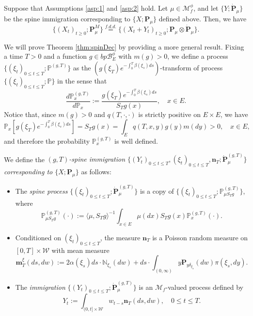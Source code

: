 \begin{thm}\label{thm:spinDec}
    Suppose that Assumptions \ref{asp:1} and \ref{asp:2} hold.
	Let $\mu \in \mathcal M_f^\phi$, and let $\{Y; \dot {\mathbf P}_\mu\}$ be the spine immigration corresponding to $\{X; \mathbf P_\mu\}$ defined above.
	Then, we have
\[
    \{(X_t)_{t\geq 0}; \mathbf P_\mu^M\}
    \overset{f.d.d.}{=} \{(X_t + Y_t)_{t\geq 0}; \mathbf P_\mu \otimes\dot{\mathbf P}_\mu\}.
\]
\end{thm}
\par
	We will prove Theorem \ref{thm:spinDec} by providing a more general result.
	Fixing a time $T>0$ and a function $g \in bp\mathscr B^\phi_E$ with $m(g)>0$, we define a process $\{(\xi_t)_{0 \leq t \leq T}; \mathbb P^{(g, T)}\}$ as the $(g(\xi_T) e^{-\int_0^T \beta(\xi_s) ds})$-transform of process $\{(\xi_t)_{0\leq t\leq T}; \mathbb P\}$ in the sense that
\[
	\frac {d \mathbb P^{(g,T)}_x} {d \mathbb P_x}
	:= \frac {g(\xi_T) e^{-\int_0^T \beta(\xi_s) ds}} {S_T g(x)},
	\quad x \in E.
\]
	Notice that, since $m(g) > 0$ and $q(T,\cdot,\cdot)$ is strictly positive on $E \times E$, we have
\[
	\mathbb P_x[ g(\xi_T) e^{-\int_0^T \beta(\xi_s) ds} ]
	= S_T g(x)
	= \int_E q(T,x,y) g(y) m(dy)
	> 0,
	\quad x \in E,
\]
	and therefore the probability $\mathbb P_x^{(g,T)}$ is well defined.
\par
	We define the \emph{$(g,T)$-spine immigration $\{(Y_t)_{0\leq t\leq T}, (\xi_t)_{0\leq t\leq T}, \mathbf n_T; \dot {\mathbf P}^{(g,T)}_\mu\}$ corresponding to $\{X; \mathbf P_\mu\}$} as follows:
\begin{itemize}
\item
	The \emph{spine process} $\{(\xi_t)_{0\leq t\leq T}; \dot{\mathbf P}^{(g,T)}_\mu\}$ is a copy of $\{(\xi_t)_{0\leq t\leq T}; \mathbb P^{(g,T)}_{\mu S_T g}\}$, where
\[
	\mathbb P_{\mu S_T g}^{(g,T)}(\cdot)
	:= \langle\mu, S_T g\rangle^{-1} \int_{x\in E} \mu(dx) S_T g(x) \mathbb P^{(g,T)}_{x} (\cdot).
\]
\item
    Conditioned on $(\xi_t)_{0 \leq t\leq T}$, the measure $\mathbf n_T$ is a Poisson random measure on $[0,T] \times \mathcal W$ with mean measure
\begin{equation}\label{eq:meanMeasImmigr}
	\mathbf m^\xi_T(ds,dw)
	:= 2 \alpha(\xi_s) ds \cdot \mathbb N_{\xi_s}(dw) + ds \cdot \int_{(0,\infty)} y \mathbf P_{y\delta_{\xi_s}}(dw) \pi(\xi_s,dy).
\end{equation}
\item
	The \emph{immigration} $\{(Y_t)_{0\leq t\leq T}; \dot{\mathbf P}^{(g,T)}_\mu\}$ is an $\mathcal M_f$-valued process defined by
\begin{equation}\label{eq:defSpinImmigr}
	Y_t
	:= \int_{(0,t] \times \mathcal W} w_{t-s} \mathbf n_T(ds,dw),
	\quad 0 \leq t\leq T.
\end{equation}
\end{itemize}
